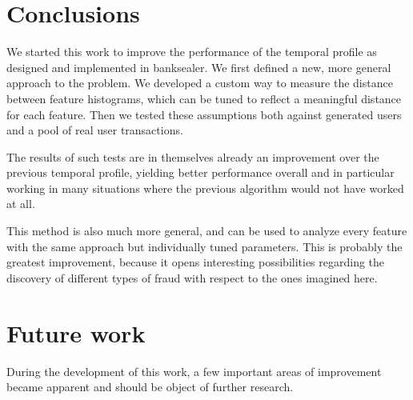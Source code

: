 \section{Conclusions}

We started this work to improve the performance of the temporal profile as designed and implemented in banksealer. We first defined a new, more general approach to the problem. We developed a custom way to measure the distance between feature histograms, which can be tuned to reflect a meaningful distance for each feature. Then we tested these assumptions both against generated users and a pool of real user transactions.

The results of such tests are in themselves already an improvement over the previous temporal profile, yielding better performance overall and in particular working in many situations where the previous algorithm would not have worked at all.

This method is also much more general, and can be used to analyze every feature with the same approach but individually tuned parameters. This is probably the greatest improvement, because it opens interesting possibilities regarding the discovery of different types of fraud with respect to the ones imagined here.

\section{Future work}

During the development of this work, a few important areas of improvement became apparent and should be object of further research.

